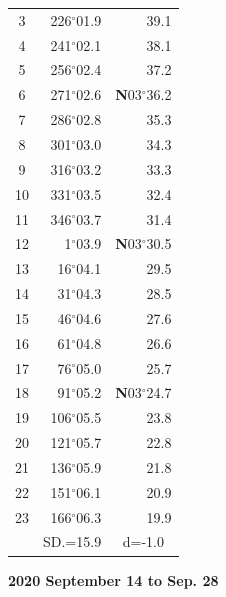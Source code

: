 \documentclass[10pt, a4paper]{report}
\begin{document}
\begin{scriptsize}
\begin{tabular*}{0.2\textwidth}[t]{@{\extracolsep{\fill}}|c|rr|}
3 & 226$^\circ$01.9 & \raisebox{0.24ex}{\boldmath$\cdot$~\boldmath$\cdot$~~}39.1\\
4 & 241$^\circ$02.1 & 38.1\\
5 & 256$^\circ$02.4 & 37.2\\[2Pt]
6 & 271$^\circ$02.6 & \textbf{N}03$^\circ$36.2\\
7 & 286$^\circ$02.8 & 35.3\\
8 & 301$^\circ$03.0 & 34.3\\
9 & 316$^\circ$03.2 & \raisebox{0.24ex}{\boldmath$\cdot$~\boldmath$\cdot$~~}33.3\\
10 & 331$^\circ$03.5 & 32.4\\
11 & 346$^\circ$03.7 & 31.4\\[2Pt]
12 & 1$^\circ$03.9 & \textbf{N}03$^\circ$30.5\\
13 & 16$^\circ$04.1 & 29.5\\
14 & 31$^\circ$04.3 & 28.5\\
15 & 46$^\circ$04.6 & \raisebox{0.24ex}{\boldmath$\cdot$~\boldmath$\cdot$~~}27.6\\
16 & 61$^\circ$04.8 & 26.6\\
17 & 76$^\circ$05.0 & 25.7\\[2Pt]
18 & 91$^\circ$05.2 & \textbf{N}03$^\circ$24.7\\
19 & 106$^\circ$05.5 & 23.8\\
20 & 121$^\circ$05.7 & 22.8\\
21 & 136$^\circ$05.9 & \raisebox{0.24ex}{\boldmath$\cdot$~\boldmath$\cdot$~~}21.8\\
22 & 151$^\circ$06.1 & 20.9\\
23 & 166$^\circ$06.3 & 19.9\\
\hline
\rule{0pt}{2.4ex} & \multicolumn{1}{c}{SD.=15.9} & \multicolumn{1}{c|}{d=-1.0}\\
\hline
\end{tabular*}

\end{scriptsize}
\newpage
\sffamily
\noindent
\begin{flushright}
\textbf{2020 September 14 to Sep. 28}\par
\end{flushright}
\end{document}
